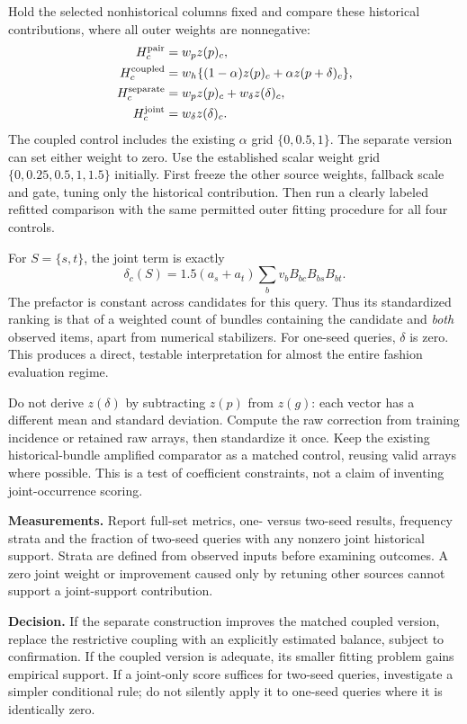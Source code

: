 \documentclass[11pt,a4paper]{article}
\begin{document}
Hold the selected nonhistorical columns fixed and compare these historical
contributions, where all outer weights are nonnegative:
\begin{align}
 H^{\rm pair}_c &=w_p z(p)_c,\notag\\
 H^{\rm coupled}_c
 &=w_h\{(1-\alpha)z(p)_c+\alpha z(p+\delta)_c\},\notag\\
 H^{\rm separate}_c &=w_p z(p)_c+w_\delta z(\delta)_c,\notag\\
 H^{\rm joint}_c &=w_\delta z(\delta)_c.
 \label{eq:histcontrols}
\end{align}
The coupled control includes the existing $\alpha$ grid
$\{0,0.5,1\}$. The separate version can set either weight to zero. Use
the established scalar weight grid $\{0,0.25,0.5,1,1.5\}$ initially.
First freeze the other source weights, fallback scale and gate, tuning only
the historical contribution. Then run a clearly labeled refitted comparison
with the same permitted outer fitting procedure for all four controls.

For $S=\{s,t\}$, the joint term is exactly
\begin{equation}
 \delta_c(S)=1.5(a_s+a_t)\sum_bv_bB_{bc}B_{bs}B_{bt}.
\end{equation}
The prefactor is constant across candidates for this query. Thus its
standardized ranking is that of a weighted count of bundles containing the
candidate and \emph{both} observed items, apart from numerical stabilizers.
For one-seed queries, $\delta$ is zero. This produces a direct, testable
interpretation for almost the entire fashion evaluation regime.

Do not derive $z(\delta)$ by subtracting $z(p)$ from $z(g)$: each vector
has a different mean and standard deviation. Compute the raw correction
from training incidence or retained raw arrays, then standardize it once.
Keep the existing historical-bundle amplified comparator as a matched
control, reusing valid arrays where possible. This is a test of coefficient
constraints, not a claim of inventing joint-occurrence scoring.

\textbf{Measurements.} Report full-set metrics, one- versus two-seed
results, frequency strata and the fraction of two-seed queries with any
nonzero joint historical support. Strata are defined from observed inputs
before examining outcomes. A zero joint weight or improvement caused only
by retuning other sources cannot support a joint-support contribution.

\textbf{Decision.} If the separate construction improves the matched
coupled version, replace the restrictive coupling with an explicitly
estimated balance, subject to confirmation. If the coupled version is
adequate, its smaller fitting problem gains empirical support. If a joint-only
score suffices for two-seed queries, investigate a simpler conditional rule;
do not silently apply it to one-seed queries where it is identically zero.
\end{document}
